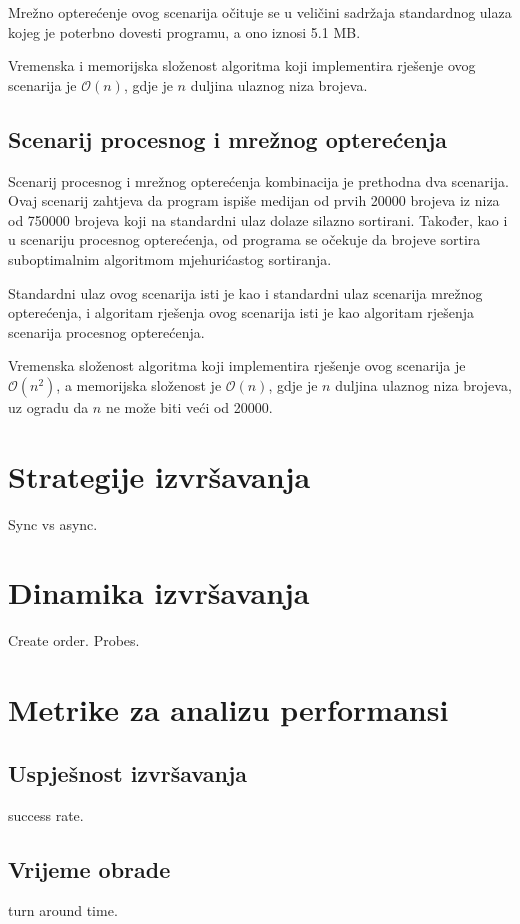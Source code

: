 \documentclass[times, utf8, diplomski]{fer}
\begin{document}
Mrežno opterećenje ovog scenarija očituje se u veličini sadržaja standardnog ulaza kojeg je poterbno dovesti programu, a ono iznosi 5.1 MB.

Vremenska i memorijska složenost algoritma koji implementira rješenje ovog scenarija je $\mathcal{O}(n)$, gdje je $n$ duljina ulaznog niza brojeva.

\subsection{Scenarij procesnog i mrežnog opterećenja}
Scenarij procesnog i mrežnog opterećenja kombinacija je prethodna dva scenarija. Ovaj scenarij zahtjeva da program ispiše medijan od prvih 20000 brojeva iz niza od 750000 brojeva koji na standardni ulaz dolaze silazno sortirani. Također, kao i u scenariju procesnog opterećenja, od programa se očekuje da brojeve sortira suboptimalnim algoritmom mjehurićastog sortiranja.

Standardni ulaz ovog scenarija isti je kao i standardni ulaz scenarija mrežnog opterećenja, i algoritam rješenja ovog scenarija isti je kao algoritam rješenja scenarija procesnog opterećenja.

Vremenska složenost algoritma koji implementira rješenje ovog scenarija je $\mathcal{O}(n^2)$, a memorijska složenost je $\mathcal{O}(n)$, gdje je $n$ duljina ulaznog niza brojeva, uz ogradu da $n$ ne može biti veći od 20000.

\section{Strategije izvršavanja}
Sync vs async.

\section{Dinamika izvršavanja}
Create order. Probes.

\section{Metrike za analizu performansi}
\subsection{Uspješnost izvršavanja}
success rate.

\subsection{Vrijeme obrade}
turn around time.
\end{document}

